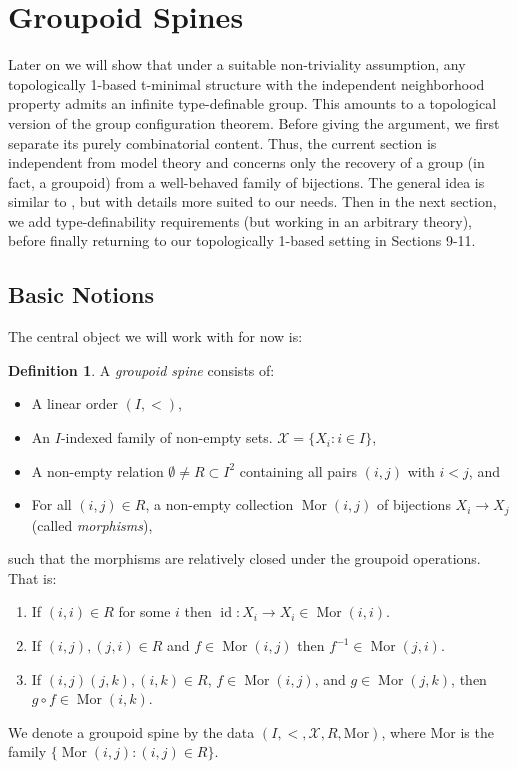 \documentclass{amsart}
\theoremstyle{definition}
\newtheorem{definition}[theorem]{Definition}
\begin{document}
\section{Groupoid Spines}

Later on we will show that under a suitable non-triviality assumption, any topologically 1-based t-minimal structure with the independent neighborhood property admits an infinite type-definable group. This amounts to a topological version of the group configuration theorem. Before giving the argument, we first separate its purely combinatorial content. Thus, the current section is independent from model theory and concerns only the recovery of a group (in fact, a groupoid) from a well-behaved family of bijections. The general idea is similar to \cite{ChePetSta}, but with details more suited to our needs. Then in the next section, we add type-definability requirements (but working in an arbitrary theory), before finally returning to our topologically 1-based setting in Sections 9-11. 

\subsection{Basic Notions}

The central object we will work with for now is:

\begin{definition}\label{D: groupoid spine}
    A \textit{groupoid spine} consists of:
    \begin{itemize}
        \item A linear order $(I,<)$,
        \item An $I$-indexed family of non-empty sets. $\mathcal X=\{X_i:i\in I\}$,
        \item A non-empty relation $\emptyset\neq R\subset I^2$ containing all pairs $(i,j)$ with $i<j$, and
        \item For all $(i,j)\in R$, a non-empty collection $\operatorname{Mor}(i,j)$ of bijections $X_i\rightarrow X_j$ (called \textit{morphisms}),
    \end{itemize}
    such that the morphisms are relatively closed under the groupoid operations. That is:
        \begin{enumerate}
        \item If $(i,i)\in R$ for some $i$ then $\operatorname{id}:X_i\rightarrow X_i\in\operatorname{Mor}(i,i)$.
        \item If $(i,j),(j,i)\in R$ and $f\in\operatorname{Mor}(i,j)$ then $f^{-1}\in\operatorname{Mor}(j,i)$.
        \item If $(i,j)(j,k),(i,k)\in R$, $f\in\operatorname{Mor}(i,j)$, and $g\in\operatorname{Mor}(j,k)$, then $g\circ f\in\operatorname{Mor}(i,k)$.
        \end{enumerate}
    We denote a groupoid spine by the data $(I,<,\mathcal X,R,\mathrm{Mor})$, where $\mathrm{Mor}$ is the family $\{\operatorname{Mor}(i,j):(i,j)\in R\}$.
\end{definition}
\end{document}
